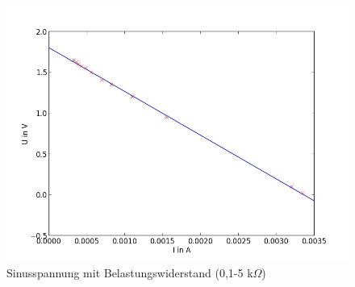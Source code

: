 	\begin{figure}[h]
		\begin{center}
		\includegraphics[scale=0.5]{picds.jpg}
		\caption{Sinusspannung mit Belastungswiderstand (0,1-5 k$\Omega$)}
		\label{picds}
		\end{center}	
	\end{figure}